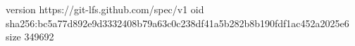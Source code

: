 version https://git-lfs.github.com/spec/v1
oid sha256:bc5a77d892e9d3332408b79a63c0c238df41a5b282b8b190fdf1ac452a2025e6
size 349692

